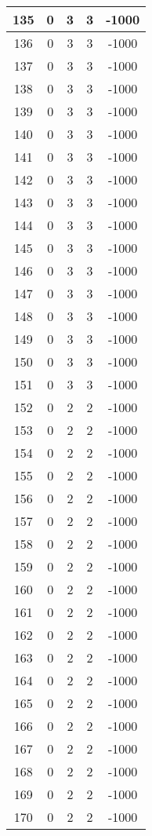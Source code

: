 \documentclass[letterpaper, 12pt]{article}
\begin{document}
\begin{longtable}{|c|c|c|c|c|}
\hline
135 & 0 & 3 & 3 & -1000 \\
\hline
136 & 0 & 3 & 3 & -1000 \\
\hline
137 & 0 & 3 & 3 & -1000 \\
\hline
138 & 0 & 3 & 3 & -1000 \\
\hline
139 & 0 & 3 & 3 & -1000 \\
\hline
140 & 0 & 3 & 3 & -1000 \\
\hline
141 & 0 & 3 & 3 & -1000 \\
\hline
142 & 0 & 3 & 3 & -1000 \\
\hline
143 & 0 & 3 & 3 & -1000 \\
\hline
144 & 0 & 3 & 3 & -1000 \\
\hline
145 & 0 & 3 & 3 & -1000 \\
\hline
146 & 0 & 3 & 3 & -1000 \\
\hline
147 & 0 & 3 & 3 & -1000 \\
\hline
148 & 0 & 3 & 3 & -1000 \\
\hline
149 & 0 & 3 & 3 & -1000 \\
\hline
150 & 0 & 3 & 3 & -1000 \\
\hline
151 & 0 & 3 & 3 & -1000 \\
\hline
152 & 0 & 2 & 2 & -1000 \\
\hline
153 & 0 & 2 & 2 & -1000 \\
\hline
154 & 0 & 2 & 2 & -1000 \\
\hline
155 & 0 & 2 & 2 & -1000 \\
\hline
156 & 0 & 2 & 2 & -1000 \\
\hline
157 & 0 & 2 & 2 & -1000 \\
\hline
158 & 0 & 2 & 2 & -1000 \\
\hline
159 & 0 & 2 & 2 & -1000 \\
\hline
160 & 0 & 2 & 2 & -1000 \\
\hline
161 & 0 & 2 & 2 & -1000 \\
\hline
162 & 0 & 2 & 2 & -1000 \\
\hline
163 & 0 & 2 & 2 & -1000 \\
\hline
164 & 0 & 2 & 2 & -1000 \\
\hline
165 & 0 & 2 & 2 & -1000 \\
\hline
166 & 0 & 2 & 2 & -1000 \\
\hline
167 & 0 & 2 & 2 & -1000 \\
\hline
168 & 0 & 2 & 2 & -1000 \\
\hline
169 & 0 & 2 & 2 & -1000 \\
\hline
170 & 0 & 2 & 2 & -1000 \\

\end{longtable}
\end{document}
